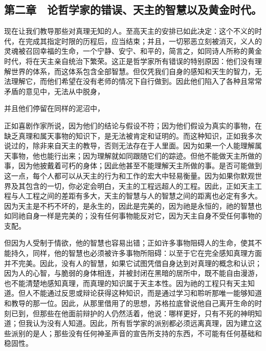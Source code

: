 
\subsection{第二章　论哲学家的错误、天主的智慧以及黄金时代。}

现在让我们教导那些对真理无知的人。至高天主的安排已如此决定：这个不义的时代，在完成其指定时限的历程后，应当结束；并且，一切邪恶立刻被消灭，义人的灵魂被召回幸福的生命，一个宁静、安宁、和平的，简言之，如同诗人所称的黄金时代，将在天主亲自统治下繁荣。这正是哲学家所有错误的特别原因：他们没有理解世界的体系，而这体系包含全部智慧。但仅凭我们自身的感知和天生的智力，无法理解它，而他们希望在没有老师的情况下自行做到。因此他们陷入了各种且常常矛盾的意见中，无法从中脱身，\par

并且他们停留在同样的泥沼中，\par

正如喜剧作家所说，因为他们的结论与假设不符；因为他们假设为真实的事物，在缺乏真理和属天事物的知识下，是无法被肯定和证明的。而这种知识，正如我多次说过的，除非来自天主的教导，否则无法存在于人里面。因为如果一个人能理解属天事物，他也能行出来；因为理解就如同跟随它们的踪迹。但他不能做天主所做的事，因为他披戴着可朽的身体；因此他甚至不能理解天主所做的事。是否可能做到这一点，每个人都可以从天主的行为和工作的宏大中轻易衡量。因为如果你默观世界及其包含的一切，你必定会明白，天主的工程远超人的工程。因此，正如天主工程与人工程之间的差距有多大，天主的智慧与人的智慧之间的距离也必定有多大。因为天主是不朽不坏的，是永生的，因此是完美的，因为祂是永恒的，祂的智慧也如同祂自身一样是完美的；没有任何事物能反对它，因为天主自身不受任何事物的支配。\par

但因为人受制于情欲，他的智慧也容易出错；正如许多事物阻碍人的生命，使其不能持久，同样，他的智慧也必须被许多事物所阻碍：以至于它在完全感知真理方面并不完美。因此，没有人的智慧，如果它试图凭借自身达到对真理的概念和认识；因为人的心智，与脆弱的身体相连，并被封闭在黑暗的居所中，既不能自由漫游，也不能清楚地感知真理，而真理的知识属于天主本性。因为祂的工程只有天主知道。但人不能通过反思或辩论获得这种知识，而是通过学习和聆听那唯一能够知道和教导的那一位。因此，从那里借用了的思想，苏格拉底曾说他自己离开生命的时刻已到，但那些在他面前辩护的人仍然活着，他说：哪样更好，只有不死的神明知道；但我认为没有人知道。因此，所有哲学家的派别都必须远离真理，因为建立这些派别的是人；那些没有任何神圣声音的宣告所支持的东西，不可能有任何基础和稳固性。\par

